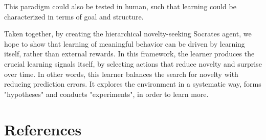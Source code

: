 \documentclass{article}
\begin{document}
This paradigm could also be tested in human, such that learning could be characterized in terms of goal and structure.

Taken together, by creating the hierarchical novelty-seeking Socrates agent, we hope to show that learning of meaningful behavior can be driven by learning itself, rather than external rewards. In this framework, the learner produces the crucial learning signals itself, by selecting actions that reduce novelty and surprise over time. In other words, this learner balances the search for novelty with reducing prediction errors. It explores the environment in a systematic way, forms "hypotheses" and conducts "experiments", in order to learn more. 

\section*{References}

\printbibliography
\end{document}
